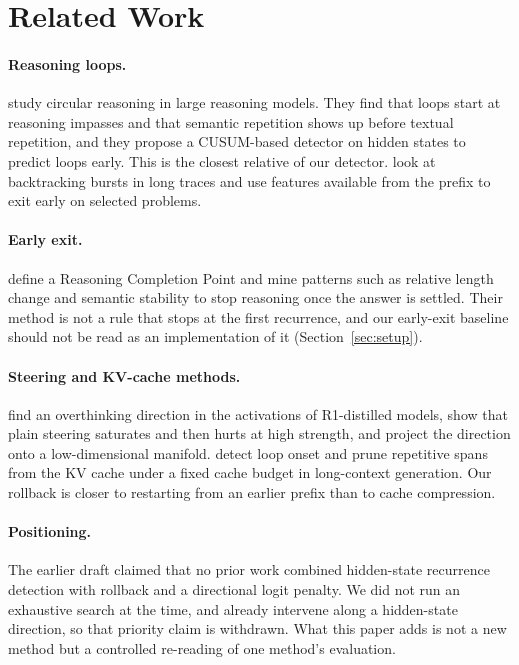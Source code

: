 \documentclass[11pt]{article}
\begin{document}
\section{Related Work}

\paragraph{Reasoning loops.} \citet{duan2026circular} study circular reasoning in large reasoning models. They find that loops start at reasoning impasses and that semantic repetition shows up before textual repetition, and they propose a CUSUM-based detector on hidden states to predict loops early. This is the closest relative of our detector. \citet{rezazadeh2026shape} look at backtracking bursts in long traces and use features available from the prefix to exit early on selected problems.

\paragraph{Early exit.} \citet{wei2025stop} define a Reasoning Completion Point and mine patterns such as relative length change and semantic stability to stop reasoning once the answer is settled. Their method is not a rule that stops at the first recurrence, and our early-exit baseline should not be read as an implementation of it (Section~\ref{sec:setup}).

\paragraph{Steering and KV-cache methods.} \citet{huang2025manifold} find an overthinking direction in the activations of R1-distilled models, show that plain steering saturates and then hurts at high strength, and project the direction onto a low-dimensional manifold. \citet{xu2026loopguard} detect loop onset and prune repetitive spans from the KV cache under a fixed cache budget in long-context generation. Our rollback is closer to restarting from an earlier prefix than to cache compression.

\paragraph{Positioning.} The earlier draft claimed that no prior work combined hidden-state recurrence detection with rollback and a directional logit penalty. We did not run an exhaustive search at the time, and \citet{huang2025manifold} already intervene along a hidden-state direction, so that priority claim is withdrawn. What this paper adds is not a new method but a controlled re-reading of one method's evaluation.
\end{document}
